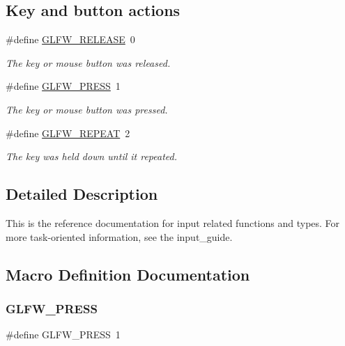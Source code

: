 \subsection*{Key and button actions}
\begin{DoxyCompactItemize}
\item 
\#define \hyperlink{group__input_gada11d965c4da13090ad336e030e4d11f}{G\+L\+F\+W\+\_\+\+R\+E\+L\+E\+A\+SE}~0
\begin{DoxyCompactList}\small\item\em The key or mouse button was released. \end{DoxyCompactList}\item 
\#define \hyperlink{group__input_ga2485743d0b59df3791c45951c4195265}{G\+L\+F\+W\+\_\+\+P\+R\+E\+SS}~1
\begin{DoxyCompactList}\small\item\em The key or mouse button was pressed. \end{DoxyCompactList}\item 
\#define \hyperlink{group__input_gac96fd3b9fc66c6f0eebaf6532595338f}{G\+L\+F\+W\+\_\+\+R\+E\+P\+E\+AT}~2
\begin{DoxyCompactList}\small\item\em The key was held down until it repeated. \end{DoxyCompactList}\end{DoxyCompactItemize}


\subsection{Detailed Description}
This is the reference documentation for input related functions and types. For more task-\/oriented information, see the input\+\_\+guide. 

\subsection{Macro Definition Documentation}
\mbox{\label{group__input_ga2485743d0b59df3791c45951c4195265}} 
\subsubsection{\texorpdfstring{G\+L\+F\+W\+\_\+\+P\+R\+E\+SS}{GLFW\_PRESS}}
{\footnotesize\ttfamily \#define G\+L\+F\+W\+\_\+\+P\+R\+E\+SS~1}



